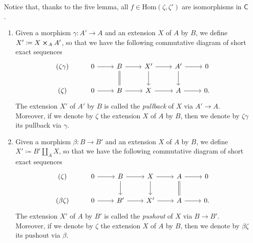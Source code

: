 \begin{rem}[]
	Notice that, thanks to the five lemma, all $f \in \mathrm{Hom} 
	\left( \zeta, \zeta' \right)$ are isomorphisms in $\mathsf{C}$.
\end{rem}


\begin{defn}\leavevmode\vspace{-\baselineskip}
\begin{enumerate}
	\item Given a morphism $\gamma\colon A' \to A$ and an extension $X$
		of $A$ by $B$, we define $X' \coloneqq X \cross_A A'$,
		so that we have the following commutative diagram
		of short exact sequences
		\begin{equation*}
		\begin{tikzcd}
			(\zeta\gamma) &
			0 \arrow[r, "", rightarrow] &
			B \arrow[r, "", rightarrow] 
			\arrow[d, "", equals] &
			X' \arrow[r, "", rightarrow] 
			\arrow[d, "", rightarrow] &
			A' \arrow[r, "", rightarrow] 
			\arrow[d, "", rightarrow] &
			0\\
			(\zeta) &
			0 \arrow[r, "", rightarrow] &
			B \arrow[r, "", rightarrow] &
			X \arrow[r, "", rightarrow] &
			A \arrow[r, "", rightarrow] &
			0
		.\end{tikzcd}
		\end{equation*}
		The extension $X'$ of $A'$ by $B$
		is called the {\em pullback} of $X$ via $A' \to A$.
		Moreover, if we denote by $\zeta$ the extension
		$X$ of $A$ by $B$, then we denote by $\zeta\gamma$
		its pullback via $\gamma$.

	\item Given a morphism $\beta\colon B \to B'$ and an extension $X$
		of $A$ by $B$, we define $X' \coloneqq B' \amalg_A X$,
		so that we have the following commutative diagram
		of short exact sequences
		\begin{equation*}
		\begin{tikzcd}
			(\zeta) &
			0 \arrow[r, "", rightarrow] &
			B \arrow[r, "", rightarrow] 
			\arrow[d, "", rightarrow] &
			X \arrow[r, "", rightarrow] 
			\arrow[d, "", rightarrow] &
			A \arrow[r, "", rightarrow] 
			\arrow[d, "", equals] &
			0\\
			(\beta\zeta) &
			0 \arrow[r, "", rightarrow] &
			B' \arrow[r, "", rightarrow] &
			X' \arrow[r, "", rightarrow] &
			A \arrow[r, "", rightarrow] &
			0
		.\end{tikzcd}
		\end{equation*}
		The extension $X'$ of $A$ by $B'$
		is called the {\em pushout} of $X$ via $B \to B'$.
		Moreover, if we denote by $\zeta$ the extension
		$X$ of $A$ by $B$, then we denote by $\beta\zeta$
		its pushout via $\beta$.
\end{enumerate}
\end{defn}



